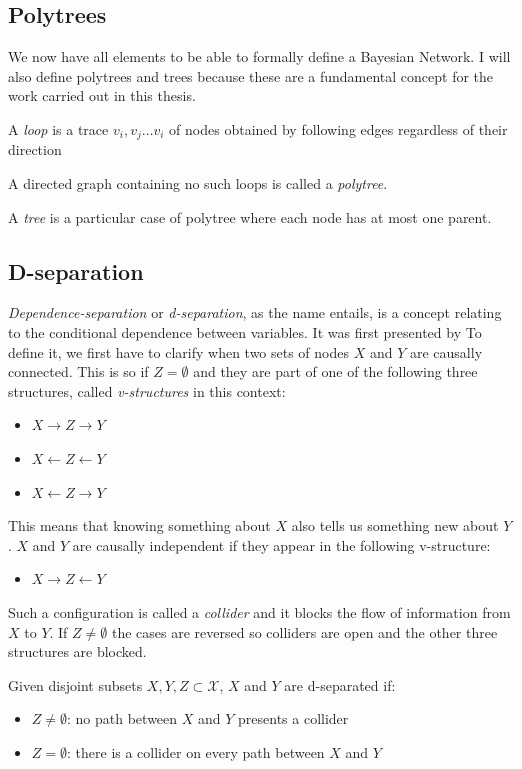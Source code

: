 \subsection{Polytrees} \label{subsec:polytrees}
We now have all elements to be able to formally define a Bayesian Network.
I will also define polytrees and trees because these are a fundamental concept for the work carried out in this thesis.
\begin{definition}
	A \textit{loop} is a trace $v_i, v_j \ldots v_i$ of nodes obtained by following edges regardless of their direction
\end{definition}
\begin{definition}
	A directed graph containing no such loops is called a \textit{polytree}. 
\end{definition}
\begin{definition}
	A \textit{tree} is a particular case of polytree where each node has at most one parent.	
\end{definition}

\subsection{D-separation} \label{subsec:d-separation}
\textit{Dependence-separation} or \textit{d-separation}, as the name entails, is a concept relating to the conditional dependence between variables.
It was first presented by \cite{Pearl1988}
To define it, we first have to clarify when two sets of nodes $X$ and $Y$ are causally connected.
This is so if $Z = \emptyset$ and they are part of one of the following three structures, called \textit{v-structures} in this context:
\begin{itemize}
  \item $X \rightarrow Z \rightarrow Y$
  \item $X \leftarrow Z \leftarrow Y$
  \item $X \leftarrow Z \rightarrow Y$
\end{itemize}
This means that knowing something about $X$ also tells us something new about $Y$.
$X$ and $Y$ are causally independent if they appear in the following v-structure:
\begin{itemize}
  \item $X \rightarrow Z \leftarrow  Y$
\end{itemize}
Such a configuration is called a \textit{collider} and it blocks the flow of information from $X$ to $Y$.
If $Z \neq \emptyset$ the cases are reversed so colliders are open and the other three structures are blocked.
\begin{definition}
	Given disjoint subsets $X, Y, Z \subset \mathcal{X}$, $X$ and $Y$ are d-separated if:
	\begin{itemize}
		\item $Z \neq \emptyset$: no path between $X$ and $Y$ presents a collider
		\item $Z = \emptyset$: there is a collider on every path between $X$ and $Y$
	\end{itemize}
\end{definition}

